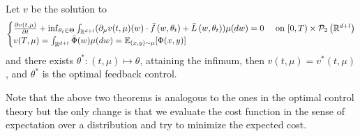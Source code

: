 \begin{theorem}
Let $v$ be the solution to $$ \begin{cases}
\frac{\partial v(t, \mu)}{\partial t}+\inf _{\theta_{t} \in \Theta}\int_{\mathbb{R}^{d+l}} (\partial_{\mu} v(t, \mu)(w) \cdot \bar{f}\left(w, \theta_{t}\right)+\bar{L}\left(w, \theta_{t}\right))\mu (dw)=0
& \text { on }[0, T) \times \mathcal{P}_{2}\left(\mathbb{R}^{d+l}\right) \\ v(T, \mu)=\int_{\mathbb{R}^{d+l}} \bar{\Phi}(w)\mu(dw) = \mathbb{E}_{(x,y) \sim \mu} [\Phi(x,y)]\end{cases}$$
and there exists $\theta^*: (t,\mu) \mapsto \theta$, attaining the infimum, then $v(t, \mu) = v^*(t, \mu)$, and $\theta^*$ is the optimal feedback control.
\end{theorem}
Note that the above two theorems is analogous to the ones in the optimal control theory but the only change is that we evaluate the cost function in the sense of expectation over a distribution and try to minimize the expected cost.








